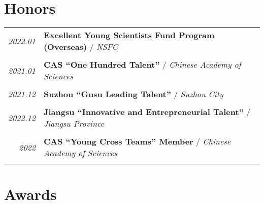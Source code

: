 \documentclass[paper=a4,fontsize=11pt]{scrartcl}
\begin{document}
\section*{Honors}

\begin{tabular}{r|p{11cm}}
	
	\emph{2022.01} & \textbf{Excellent Young Scientists Fund Program (Overseas)} / \emph{NSFC}\\
	\multicolumn{2}{c}{} \\
	
	\emph{2021.01} & \textbf{CAS ``One Hundred Talent''} / \emph{Chinese Academy of Sciences}\\
	\multicolumn{2}{c}{} \\
	
	
	\emph{2021.12} & \textbf{Suzhou ``Gusu Leading Talent''} / \emph{Suzhou City}\\
	\multicolumn{2}{c}{} \\

	\emph{2022.12} & \textbf{Jiangsu ``Innovative and Entrepreneurial Talent''} / \emph{Jiangsu Province}\\
	\multicolumn{2}{c}{} \\
	
	\emph{2022} & \textbf{CAS ``Young Cross Teams'' Member} / \emph{Chinese Academy of Sciences}\\
	\multicolumn{2}{c}{}
	
	
\end{tabular}


\section*{Awards}
\end{document}
